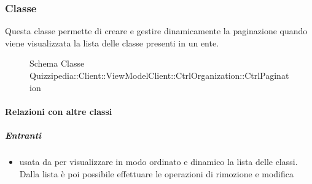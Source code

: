 \subsubsection{Classe }
Questa classe permette di creare e gestire dinamicamente la paginazione quando viene visualizzata la lista delle classe presenti in un ente.
\begin{figure}[H]
\centering
\noindent{}
\caption[Schema Classe CtrlPagination]{Schema Classe Quizzipedia::Client::ViewModelClient::CtrlOrganization::CtrlPagination}
\end{figure}
\paragraph{Relazioni con altre classi}
\subparagraph{Entranti}
\begin{itemize}
\item usata da  per visualizzare in modo ordinato e dinamico la lista delle classi. Dalla lista è poi possibile effettuare le operazioni di rimozione e modifica
\end{itemize}
